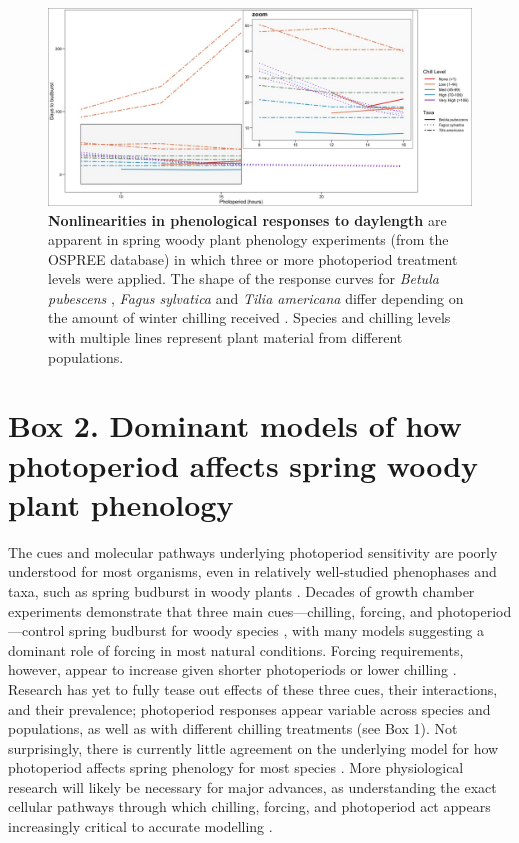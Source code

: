 \documentclass{article}
\begin{document}
\renewcommand{\thefigure}{\hspace{-.333333em}}
\begin{figure}[h]
\includegraphics{..//..//analyses/photoperiod/figures/Photo_curv_FINAL.jpeg} 
\caption{\textbf{Nonlinearities in phenological responses to daylength} are apparent in spring woody plant phenology experiments (from the OSPREE database) in which three or more photoperiod treatment levels were applied. The shape of the response curves for \textit{Betula pubescens} \citep{Caffarra:2011b}, \textit{Fagus sylvatica} \citep{Heide:1993a} and \textit{Tilia americana} \citep{Ashby:1962aa} differ depending on the amount of winter chilling received \citep[measured in Chill portions][]{fishman1987}. Species and chilling levels with multiple lines represent plant material from different populations.}


 \label{fig:photocurve}
 \end{figure}

 
\section*{Box 2. Dominant models of how photoperiod affects spring woody plant phenology}
\par The cues and molecular pathways underlying photoperiod sensitivity are poorly understood for most organisms, even in relatively well-studied phenophases and taxa, such as spring budburst in woody plants \citep{ding2016}. Decades of growth chamber experiments demonstrate that three main cues---chilling, forcing, and photoperiod---control spring budburst for woody species \citep{flynn2018, zohner2016,Heide:2008aa}, with many models suggesting a dominant role of forcing in most natural conditions. Forcing requirements, however, appear to increase given shorter photoperiods or lower chilling \citep{Caffarra:2011qf,chuine2010}. Research has yet to fully tease out effects of these three cues, their interactions, and their prevalence;  photoperiod responses appear variable across species and populations, as well as with different chilling treatments (see Box 1). Not surprisingly, there is currently little agreement on the underlying model for how photoperiod affects spring phenology for most species \citep{chuine2016,hanninen2019}. More physiological research will likely be necessary for major advances, as understanding the exact cellular pathways through which chilling, forcing, and photoperiod act appears increasingly critical to accurate modelling \citep{vanderschoot2014,hanninen2019}. 
\end{document}
